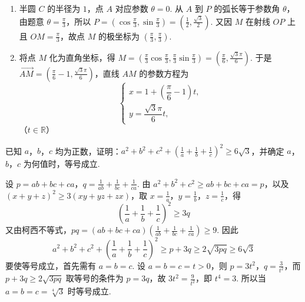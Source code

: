 \begin{solution}
\begin{enumerate}
\item 半圆 \(C\) 的半径为 \(1\)，点 \(A\) 对应参数 \(\theta=0\). 从 \(A\) 到 \(P\) 的弧长等于参数角 \(\theta\)，由题意 \(\theta=\frac{\pi}{3}\)，所以 \(P=\left(\cos\frac{\pi}{3},\sin\frac{\pi}{3}\right)=\left(\frac{1}{2},\frac{\sqrt{3}}{2}\right)\). 又因 \(M\) 在射线 \(OP\) 上且 \(OM=\frac{\pi}{3}\)，故点 \(M\) 的极坐标为 \(\left(\frac{\pi}{3},\frac{\pi}{3}\right)\).
\item 将点 \(M\) 化为直角坐标，得 \(M=\left(\frac{\pi}{3}\cos\frac{\pi}{3},\frac{\pi}{3}\sin\frac{\pi}{3}\right)=\left(\frac{\pi}{6},\frac{\sqrt{3}\pi}{6}\right)\). 于是 \(\overrightarrow{AM}=\left(\frac{\pi}{6}-1,\frac{\sqrt{3}\pi}{6}\right)\)，直线 \(AM\) 的参数方程为
\[
\begin{cases}
x=1+\left(\dfrac{\pi}{6}-1\right)t,\\
y=\dfrac{\sqrt{3}\pi}{6}t,
\end{cases}
\]
（\(t\in\mathbb{R}\)）
\end{enumerate}
\end{solution}

\begin{problem}
已知 \(a\)，\(b\)，\(c\) 均为正数，证明：\(a^2+b^2+c^2+\left(\frac{1}{a}+\frac{1}{b}+\frac{1}{c}\right)^2\geqslant 6\sqrt{3}\)，并确定 \(a\)，\(b\)，\(c\) 为何值时，等号成立.
\end{problem}

\begin{solution}
设 \(p=ab+bc+ca\)，\(q=\frac{1}{ab}+\frac{1}{bc}+\frac{1}{ca}\). 由 \(a^2+b^2+c^2\geqslant ab+bc+ca=p\)，以及 \((x+y+z)^2\geqslant3(xy+yz+zx)\)，取 \(x=\frac{1}{a}\)，\(y=\frac{1}{b}\)，\(z=\frac{1}{c}\)，得
\[
\left(\frac{1}{a}+\frac{1}{b}+\frac{1}{c}\right)^2\geqslant3q
\]
又由柯西不等式，\(pq=(ab+bc+ca)\left(\frac{1}{ab}+\frac{1}{bc}+\frac{1}{ca}\right)\geqslant9\). 因此
\[
a^2+b^2+c^2+\left(\frac{1}{a}+\frac{1}{b}+\frac{1}{c}\right)^2\geqslant p+3q\geqslant2\sqrt{3pq}\geqslant6\sqrt{3}
\]
要使等号成立，首先需有 \(a=b=c\). 设 \(a=b=c=t>0\)，则 \(p=3t^2\)，\(q=\frac{3}{t^2}\)，而 \(p+3q\geqslant2\sqrt{3pq}\) 取等号的条件为 \(p=3q\)，故 \(3t^2=\frac{9}{t^2}\)，即 \(t^4=3\). 所以当 \(a=b=c=\sqrt[4]{3}\) 时等号成立.
\end{solution}
